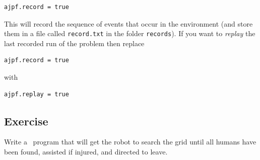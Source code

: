 \begin{verbatim}
ajpf.record = true
\end{verbatim}

This will record the sequence of events that occur in the environment (and store them in a file called \texttt{record.txt} in the folder \texttt{records}).  If you want to \emph{replay} the last recorded run of the problem then replace

\begin{verbatim}
ajpf.record = true
\end{verbatim}

with 

\begin{verbatim}
ajpf.replay = true
\end{verbatim}

\subsection{Exercise}
Write a \gwendolen\ program that will get the robot to search the grid until all humans have been found, assisted if injured, and directed to leave.

